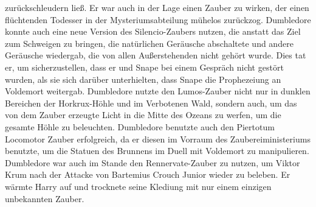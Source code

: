 \documentclass[a4paper, 10pt]{article}
\begin{document}
zurückschleudern ließ. Er war auch in der Lage einen Zauber zu wirken, der einen flüchtenden Todesser in der Mysteriumsabteilung mühelos zurückzog. Dumbledore konnte auch eine neue Version des Silencio-Zaubers nutzen, die anstatt das Ziel zum Schweigen zu bringen, die natürlichen Geräusche abschaltete und andere Geräusche wiedergab, die von allen Außerstehenden nicht gehört wurde. Dies tat er, um sicherzustellen, dass er und Snape bei einem Gespräch nicht gestört wurden, als sie sich darüber unterhielten, dass Snape die Prophezeiung an Voldemort weitergab. Dumbledore nutzte den Lumos-Zauber nicht nur in dunklen Bereichen der Horkrux-Höhle und im Verbotenen Wald, sondern auch, um das von dem Zauber erzeugte Licht in die Mitte des Ozeans zu werfen, um die gesamte Höhle zu beleuchten. Dumbledore benutzte auch den Piertotum Locomotor Zauber erfolgreich, da er diesen im Vorraum des Zaubereiministeriums benutzte, um die Statuen des Brunnens im Duell mit Voldemort zu manipulieren. Dumbledore war auch im Stande den Rennervate-Zauber zu nutzen, um Viktor Krum nach der Attacke von Bartemius Crouch Junior wieder zu beleben. Er wärmte Harry auf und trocknete seine Klediung mit nur einem einzigen unbekannten Zauber.
\end{document}
